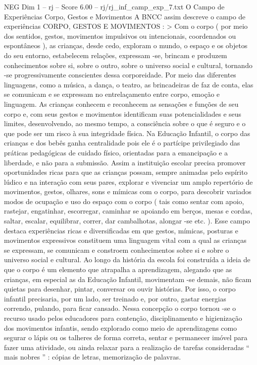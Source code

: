 \begin{textsample}{NEG Dim 1 – rj – Score 6.00 – rj/rj\_inf\_camp\_exp\_7.txt}  \label{ex:f1_neg_019}
O Campo de Experiências Corpo, Gestos e Movimentos A BNCC assim descreve o campo de experiências CORPO, GESTOS E MOVIMENTOS : > Com o corpo ( por meio dos sentidos, gestos, movimentos impulsivos ou intencionais, coordenados ou espontâneos ), as crianças, desde cedo, exploram o mundo, o espaço e os objetos do seu entorno, estabelecem relações, expressam -se, brincam e produzem conhecimentos sobre si, sobre o outro, sobre o universo social e cultural, tornando -se progressivamente conscientes dessa corporeidade.
Por meio das diferentes linguagens, como a música, a dança, o teatro, as brincadeiras de faz de conta, elas se comunicam e se expressam no entrelaçamento entre corpo, emoção e linguagem.
As crianças conhecem e reconhecem as sensações e funções de seu corpo e, com seus gestos e movimentos identificam suas potencialidades e seus limites, desenvolvendo, ao mesmo tempo, a consciência sobre o que é seguro e o que pode ser um risco à sua integridade física.
Na Educação Infantil, o corpo das crianças e dos bebês ganha centralidade pois ele é o partícipe privilegiado das práticas pedagógicas de cuidado físico, orientadas para a emancipação e a liberdade, e não para a submissão.
Assim a instituição escolar precisa promover oportunidades ricas para que as crianças possam, sempre animadas pelo espírito lúdico e na interação com seus pares, explorar e vivenciar um amplo repertório de movimentos, gestos, olhares, sons e mímicas com o corpo, para descobrir variados modos de ocupação e uso do espaço com o corpo ( tais como sentar com apoio, rastejar, engatinhar, escorregar, caminhar se apoiando em berços, mesas e cordas, saltar, escalar, equilibrar, correr, dar cambalhotas, alongar -se etc. ).
Esse campo destaca experiências ricas e diversificadas em que gestos, mímicas, posturas e movimentos expressivos constituem uma linguagem vital com a qual as crianças se expressam, se comunicam e constroem conhecimentos sobre si e sobre o universo social e cultural.
Ao longo da história da escola foi construída a ideia de que o corpo é um elemento que atrapalha a aprendizagem, alegando que as crianças, em especial as da Educação Infantil, movimentam -se demais, não ficam quietas para desenhar, pintar, conversar ou ouvir histórias.
Por isso, o corpo infantil precisaria, por um lado, ser treinado e, por outro, gastar energias correndo, pulando, para ficar cansado.
Nessa concepção o corpo tornou -se o recurso usado pelos educadores para contenção, disciplinamento e higienização dos movimentos infantis, sendo explorado como meio de aprendizagens como segurar o lápis ou os talheres de forma correta, sentar e permanecer imóvel para fazer uma atividade, ou ainda relaxar para a realização de tarefas consideradas “ mais nobres ” : cópias de letras, memorização de palavras.

\end{textsample}
